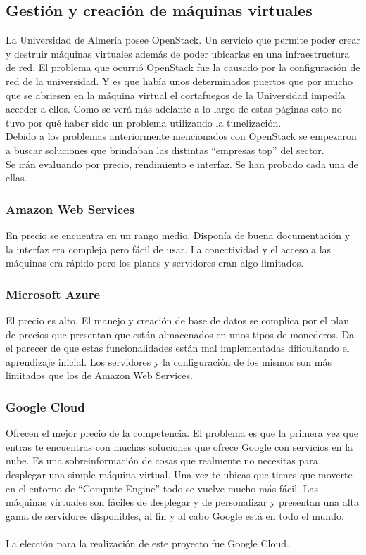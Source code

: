 \subsection{Gestión y creación de máquinas virtuales}
La Universidad de Almería posee OpenStack. Un servicio que permite poder crear y destruir máquinas virtuales además de poder ubicarlas en una infraestructura de red. El problema que ocurrió OpenStack fue la causado por la configuración de red de la universidad. Y es que había unos determinados puertos que por mucho que se abriesen en la máquina virtual el cortafuegos de la Universidad impedía acceder a ellos. Como se verá más adelante a lo largo de estas páginas esto no tuvo por qué haber sido un problema utilizando la tunelización.
\\Debido a los problemas anteriormente mencionados con OpenStack se empezaron a buscar soluciones que brindaban las distintas ``empresas top'' del sector.
\\Se irán evaluando por precio, rendimiento e interfaz. Se han probado cada una de ellas.

\subsubsection{Amazon Web Services}
En precio se encuentra en un rango medio. Disponía de buena documentación y la interfaz era compleja pero fácil de usar. La conectividad y el acceso a las máquinas era rápido pero los planes y servidores eran algo limitados.
\subsubsection{Microsoft Azure}
El precio es alto. El manejo y creación de base de datos se complica por el plan de precios que presentan que están almacenados en unos tipos de monederos. Da el parecer de que estas funcionalidades están mal implementadas dificultando el aprendizaje inicial. Los servidores y la configuración de los mismos son más limitados que los de Amazon Web Services.
\subsubsection{Google Cloud}
Ofrecen el mejor precio de la competencia. El problema es que la primera vez que entras te encuentras con muchas soluciones que ofrece Google con servicios en la nube. Es una sobreinformación de cosas que realmente no necesitas para desplegar una simple máquina virtual. Una vez te ubicas que tienes que moverte en el entorno de ``Compute Engine'' todo se vuelve mucho más fácil. Las máquinas virtuales son fáciles de desplegar y de personalizar y presentan una alta gama de servidores disponibles, al fin y al cabo Google está en todo el mundo.
\\\\La elección para la realización de este proyecto fue Google Cloud.